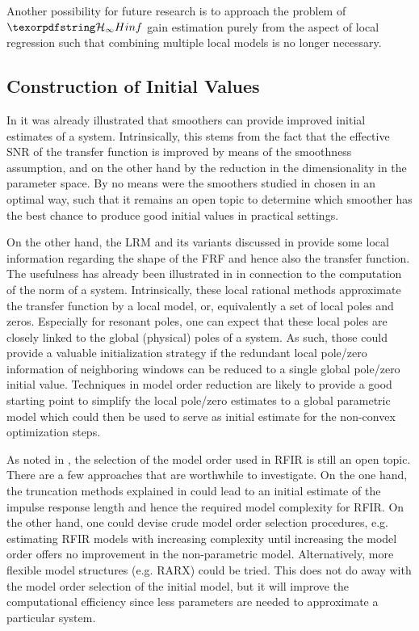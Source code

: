   Another possibility for future research is to approach the problem of $\Hinf$ gain estimation purely from the aspect of local regression such that combining multiple local models is no longer necessary.

  \subsection{Construction of Initial Values}
  In  it was already illustrated that smoothers can provide improved initial estimates of a system. 
  Intrinsically, this stems from the fact that the effective \gls{SNR} of the transfer function is improved by means of the smoothness assumption, and on the other hand by the reduction in the dimensionality in the parameter space.
  By no means were the  smoothers studied in  chosen in an optimal way, such that it remains an open topic to determine which smoother has the best chance to produce good initial values in practical settings.

  On the other hand, the \gls{LRM} and its variants discussed in  provide some local information regarding the shape of the \gls{FRF} and hence also the transfer function.
  The usefulness has already been illustrated in  in connection to the computation of the \Hinf norm of a system.
  Intrinsically, these local rational methods approximate the transfer function by a local model, or, equivalently a set of local poles and zeros.
  Especially for resonant poles, one can expect that these local poles are closely linked to the global (physical) poles of a system.
  As such, those could provide a valuable initialization strategy if the redundant local pole/zero information of neighboring windows can be reduced to a single global pole/zero initial value.
  Techniques in model order reduction are likely to provide a good starting point to simplify the local pole/zero estimates to a global parametric model which could then be used to serve as initial estimate for the non-convex optimization steps.

As noted in , the selection of the model order used in \gls{RFIR} is still an open topic.
There are a few approaches that are worthwhile to investigate.
On the one hand, the truncation methods explained in  could lead to an initial estimate of the impulse response length and hence the required model complexity for \gls{RFIR}.
On the other hand, one could devise crude model order selection procedures, e.g.  estimating \gls{RFIR} models with increasing complexity until increasing the model order offers no improvement in the non-parametric model.
Alternatively, more flexible model structures (e.g. \gls{RARX}) could be tried.
This does not do away with the model order selection of the initial model, but it will improve the computational efficiency since less parameters are needed to approximate a particular system.

  

